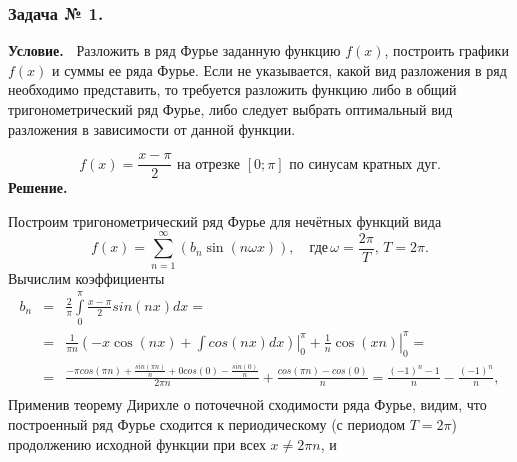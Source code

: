 \subsubsection*{\center Задача № 1.}
{\bf Условие.~}
Разложить в ряд Фурье заданную функцию $f(x)$, построить графики $f(x)$ и суммы ее ряда Фурье. Если не указывается, какой вид разложения в ряд необходимо представить, то требуется разложить функцию либо в общий тригонометрический ряд Фурье, либо следует выбрать оптимальный вид разложения в зависимости от данной функции.


\[ 
f(x)=\frac{x-\pi}{2} \text{ на отрезке } [0; \pi] \text{ по синусам кратных дуг.}
\]
{\bf Решение.~}	
\begin{center}
\end{center}
\noindent
Построим тригонометрический ряд Фурье для нечётных функций вида
$$
f(x)=\sum_{n=1}^\infty 
	\left(b_n\sin{(n\omega x)}\right),\quad\text{где}\,\omega=\frac{2\pi}{T},\,T=2\pi.
$$
\noindent
Вычислим коэффициенты
$$
\begin{array}{rcl}
b_n &=& \displaystyle\frac{2}{\pi}
	\int\limits_0^\pi
	\frac{x-\pi}{2} sin(nx)dx ={}									\\[12pt]
	&=& \displaystyle\frac{1}{\pi n}\left(-\left.x\cos(nx)+\int cos(nx)dx\right) \right|_0^\pi
	+\left.\frac{1}{n}\cos(xn) \right|_0^\pi = 	\\[12pt]
	&=& \displaystyle\frac{-\pi cos(\pi n) + \frac{sin(\pi n)}{n} + 0 cos(0) - \frac{sin(0)}{n}}{2\pi n}+\frac{cos(\pi n) - cos(0)}{n} = \frac{(-1)^n - 1}{n} - \frac{(-1)^n}{n},	\\[12pt]
\end{array}
$$
Применив теорему Дирихле о поточечной сходимости ряда Фурье, видим, что построенный ряд Фурье сходится 
к периодическому (с периодом $T=2\pi$) продолжению исходной функции при всех $x\ne 2\pi n$, и 
